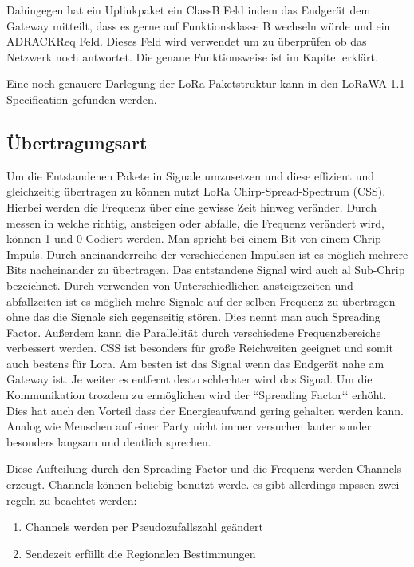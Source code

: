 \documentclass[a4paper,12pt]{article}
\begin{document}
            Dahingegen hat ein Uplinkpaket ein ClassB Feld indem das Endgerät dem Gateway mitteilt, dass es gerne auf 
            Funktionsklasse B wechseln würde und ein ADRACKReq Feld. Dieses Feld wird verwendet um zu überprüfen ob 
            das Netzwerk noch antwortet. Die genaue Funktionsweise ist im Kapitel  erklärt.

            Eine noch genauere Darlegung der LoRa-Paketstruktur kann in den LoRaWA 1.1 Specification \cite{LoRaSpec} 
            gefunden werden.

            
            
        \subsection{Übertragungsart}\label{sec:Modulation}
            Um die Entstandenen Pakete in Signale umzusetzen und diese effizient und gleichzeitig übertragen zu können
            nutzt LoRa Chirp-Spread-Spectrum (CSS). Hierbei werden die Frequenz über eine gewisse Zeit hinweg 
            veränder. Durch messen in welche richtig, ansteigen oder abfalle, die Frequenz verändert wird, können 1 
            und 0 Codiert werden. Man spricht bei einem Bit von einem Chrip-Impuls. Durch aneinanderreihe der 
            verschiedenen Impulsen ist es möglich mehrere Bits nacheinander zu übertragen. Das entstandene Signal 
            wird auch al Sub-Chrip bezeichnet. Durch verwenden von Unterschiedlichen ansteigezeiten und abfallzeiten 
            ist es möglich mehre Signale auf der selben Frequenz zu übertragen ohne das die Signale sich gegenseitig 
            stören. Dies nennt man auch Spreading Factor. Außerdem kann die Parallelität durch verschiedene 
            Frequenzbereiche verbessert werden. CSS ist besonders für große Reichweiten geeignet und somit auch 
            bestens für Lora. Am besten ist das Signal wenn das Endgerät nahe am Gateway ist. Je weiter es entfernt 
            desto schlechter wird das Signal. Um die Kommunikation trozdem zu ermöglichen wird der ``Spreading 
            Factor‘‘ erhöht. Dies hat auch den Vorteil dass der Energieaufwand gering gehalten werden kann. 
            Analog wie Menschen auf einer Party nicht immer versuchen lauter sonder besonders langsam und deutlich 
            sprechen.\cite{explain}

            Diese Aufteilung durch den Spreading Factor und die Frequenz werden Channels erzeugt. Channels können 
            beliebig benutzt werde. es gibt allerdings mpssen zwei regeln zu beachtet werden: 
            \begin{enumerate}   
                \item Channels werden per Pseudozufallszahl geändert
                \item Sendezeit erfüllt die Regionalen Bestimmungen
            \end{enumerate}
            
\end{document}
